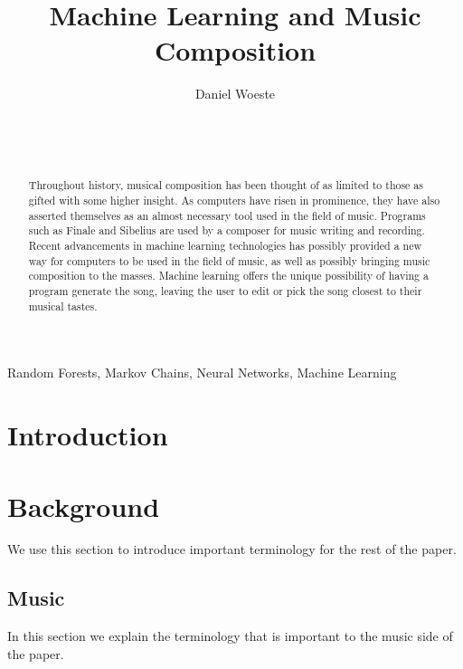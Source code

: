 \documentclass{sig-alternate}
\begin{document}

\title{Machine Learning and Music Composition}
\author{
\alignauthor
Daniel Woeste\\
	\\
	\\
	\\
}


\maketitle
\begin{abstract}
Throughout history, musical composition has been thought of as limited to those as gifted with some higher insight. As computers have risen in prominence, they have also asserted themselves as an almost necessary tool used in the field of music. Programs such as Finale and Sibelius are used by a composer for music writing and recording. Recent advancements in machine learning technologies has possibly provided a new way for computers to be used in the field of music, as well as possibly bringing music composition to the masses. Machine learning offers the unique possibility of having a program generate the song, leaving the user to edit or pick the song closest to their musical tastes. 

\end{abstract}

\keywords
Random Forests, Markov Chains, Neural Networks, Machine Learning

\section{Introduction}
\label{sec:introduction}

\section{Background}
\label{sec:background}
	We use this section to introduce important terminology for the rest of the paper.

\subsection{Music}
\label{sec:music}
	In this section we explain the terminology that is important to the music side of the paper.
\end{document}
